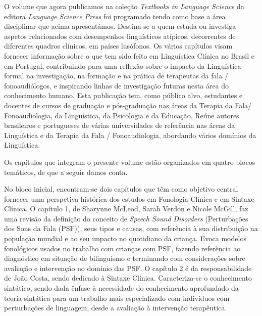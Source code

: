 \begin{refsection}
O volume que agora publicamos na coleção \emph{Textbooks in Language Science} da editora \emph{Language Science Press} foi programado tendo como base a área disciplinar que acima apresentámos. Destina-se a quem estuda ou investiga aspetos relacionados com desempenhos linguísticos atípicos, decorrentes de diferentes quadros clínicos, em países lusófonos. Os vários capítulos visam fornecer informação sobre o que tem sido feito em Linguística Clínica no Brasil e em Portugal, contribuindo para uma reflexão sobre o impacto da Linguística formal na investigação, na formação e na prática de terapeutas da fala / fonoaudiólogos, e inspirando linhas de investigação futuras nesta área do conhecimento humano. Esta publicação tem, como público alvo, estudantes e docentes de cursos de graduação e pós-graduação nas áreas da Terapia da Fala/ Fonoaudiologia, da Linguística, da Psicologia e da Educação. Reúne autores brasileiros e portugueses de várias universidades de referência nas áreas da Linguística e da Terapia da Fala / Fonoaudiologia, abordando vários domínios da Linguística. 

Os capítulos que integram o presente volume estão organizados em quatro blocos temáticos, de que a seguir damos conta. 

No bloco inicial, encontram-se dois capítulos que têm como objetivo central fornecer uma perspetiva histórica dos estudos em Fonologia Clínica e em Sintaxe Clínica. O capítulo 1, de Sharynne McLeod, Sarah Verdon e Nicole McGill, faz uma revisão da definição do conceito de \emph{Speech Sound Disorders} (Perturbações dos Sons da Fala (PSF)), seus tipos e causas, com referência à sua distribuição na população mundial e ao seu impacto no quotidiano da criança. Evoca modelos fonológicos usados no trabalho com crianças com PSF, fazendo referência ao diagnóstico em situação de bilinguismo e terminando com considerações sobre avaliação e intervenção no domínio das PSF. O capítulo 2 é da responsabilidade de João Costa, sendo dedicado à Sintaxe Clínica. Caracteriza-se o conhecimento sintático, sendo dada ênfase à necessidade do conhecimento aprofundado da teoria sintática para um trabalho mais especializado com indivíduos com perturbações de linguagem, desde a avaliação à intervenção terapêutica. 


\end{refsection}
